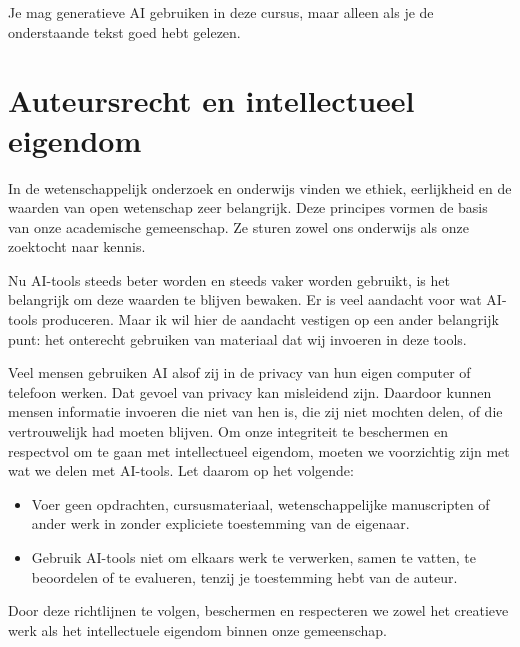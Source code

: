 \documentclass[
  letterpaper,
  DIV=11,
  numbers=noendperiod]{scrreprt}
\providecommand{\tightlist}{%
  \setlength{\itemsep}{0pt}\setlength{\parskip}{0pt}}
\begin{document}
Je mag generatieve AI gebruiken in deze cursus, maar alleen als je de
onderstaande tekst goed hebt gelezen.

\section*{Auteursrecht en intellectueel
eigendom}\label{auteursrecht-en-intellectueel-eigendom}


\begin{tcolorbox}[enhanced jigsaw, arc=.35mm, bottomrule=.15mm, bottomtitle=1mm, breakable, colback=white, colbacktitle=quarto-callout-tip-color!10!white, colframe=quarto-callout-tip-color-frame, coltitle=black, left=2mm, leftrule=.75mm, opacityback=0, opacitybacktitle=0.6, rightrule=.15mm, title=\textcolor{quarto-callout-tip-color}{\faLightbulb}\hspace{0.5em}{Weet je wat je wel en niet mag invoeren?}, titlerule=0mm, toprule=.15mm, toptitle=1mm]

In de wetenschappelijk onderzoek en onderwijs vinden we ethiek,
eerlijkheid en de waarden van open wetenschap zeer belangrijk. Deze
principes vormen de basis van onze academische gemeenschap. Ze sturen
zowel ons onderwijs als onze zoektocht naar kennis.

Nu AI-tools steeds beter worden en steeds vaker worden gebruikt, is het
belangrijk om deze waarden te blijven bewaken. Er is veel aandacht voor
wat AI-tools produceren. Maar ik wil hier de aandacht vestigen op een
ander belangrijk punt: het onterecht gebruiken van materiaal dat wij
invoeren in deze tools.

Veel mensen gebruiken AI alsof zij in de privacy van hun eigen computer
of telefoon werken. Dat gevoel van privacy kan misleidend zijn. Daardoor
kunnen mensen informatie invoeren die niet van hen is, die zij niet
mochten delen, of die vertrouwelijk had moeten blijven. Om onze
integriteit te beschermen en respectvol om te gaan met intellectueel
eigendom, moeten we voorzichtig zijn met wat we delen met AI-tools. Let
daarom op het volgende:

\begin{itemize}
\tightlist
\item
  Voer geen opdrachten, cursusmateriaal, wetenschappelijke manuscripten
  of ander werk in zonder expliciete toestemming van de eigenaar.
\item
  Gebruik AI-tools niet om elkaars werk te verwerken, samen te vatten,
  te beoordelen of te evalueren, tenzij je toestemming hebt van de
  auteur.
\end{itemize}

Door deze richtlijnen te volgen, beschermen en respecteren we zowel het
creatieve werk als het intellectuele eigendom binnen onze gemeenschap.

\end{tcolorbox}
\end{document}
